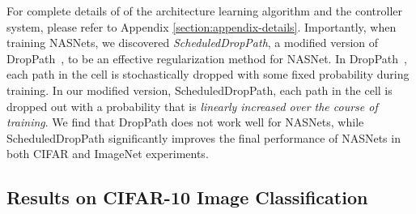 \documentclass[10pt,twocolumn,letterpaper]{article}
\begin{document}
For complete details of of the architecture learning algorithm and the controller system, please refer to  Appendix \ref{section:appendix-details}. Importantly, when training NASNets, we discovered \emph{ScheduledDropPath}, a modified version of DropPath~\cite{larsson2016fractalnet}, to be an effective regularization method for NASNet. In DropPath~\cite{larsson2016fractalnet}, each path in the cell is stochastically dropped with some fixed probability during training.  In our modified version, ScheduledDropPath, each path in the cell is dropped out with a probability that is \emph{linearly increased over the course of training}. We find that DropPath does not work well for NASNets, while ScheduledDropPath  significantly improves the final performance of NASNets in both CIFAR and ImageNet experiments.

\subsection{Results on CIFAR-10 Image Classification}%
\end{document}
